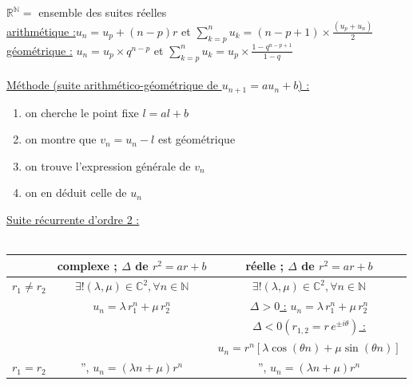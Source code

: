 \documentclass[12 pt]{book}
\begin{document}
\begin{flushleft}
\begin{doublespace}

	$\mathbb{R}^\mathbb{N} =$ ensemble des suites réelles\\
	\underline{arithmétique :}$u_n=u_p+(n-p)r$ et $\sum\limits_{k=p}^n u_k = (n-p+1)\times \frac{(u_p + u_n)}{2}$ \\
	\underline{géométrique :} $u_n = u_p \times q^{n-p}$ et $\sum\limits_{k = p}^n u_k = u_p \times \frac{1 - q^{n -p + 1}}{1 - q}$\\
	
	\text{ }\\
	\underline{Méthode (suite arithmético-géométrique de $u_{n+1} = au_n + b$) :}\\
	
	\begin{enumerate}
		\item on cherche le point fixe $l = a l+b$
		\item on montre que $v_n = u_n - l$ est géométrique
		\item on trouve l'expression générale de $v_n$
		\item on en déduit celle de $u_n$
	\end{enumerate}
	\underline{Suite récurrente d'ordre 2 :}\\
	\text{}\\
	\begin{tabular}{|c|c|c|}
	\cline{2-3}
	\multicolumn{1}{c|}{}& complexe ; $\Delta$ de $r^2 = a r + b$ & réelle ; $\Delta$ de $r^2 = a r + b$ \\
	\hline
	$r_1 \ne r_2$ & $\exists ! (\lambda , \mu)\in \mathbb{C}^2, \forall n\in \mathbb{N}$ & $\exists ! (\lambda , \mu)\in \mathbb{C}^2, \forall n\in \mathbb{N}$ \\
	& $u_n = \lambda \, r_1^n + \mu \, r_2^n$ &  \underline{$\Delta > 0$ :} $u_n = \lambda \, r_1^n + \mu \, r_2^n$\\
	& & \underline{$\Delta < 0 (r_{1,2} = r\, e^{\pm i \theta})$ :} \\
	& & $u_n =r^n [ \lambda \cos{(\theta n)} + \mu \sin{(\theta n)}]$\\
	\hline
	$r_1 = r_2$ & '', $u_n = (\lambda n + \mu) r^n$ &  '', $u_n = (\lambda n + \mu) r^n$\\
	\hline
	\end{tabular}
	

\end{doublespace}
\end{flushleft}
\end{document}
